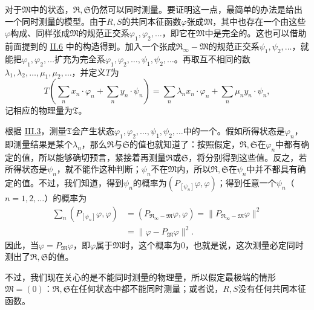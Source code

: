 \documentclass[fontsize=13pt,twoside,openany,headings=normal,parskip=false,bookmarkpackage=false,DIV=calc]{scrbook}
\begin{document}
对于$\mathfrak M$中的状态，$\mathfrak R,\allowbreak \mathfrak S$仍然可以同时测量。要证明这一点，最简单的办法是给出一个同时测量的模型。\hypertarget{origpage-122}{}\label{origpage-122}由于$R,\allowbreak S$的共同本征函数$\varphi$张成$\mathfrak M$，其中也存在一个由这些$\varphi$构成、同样张成$\mathfrak M$的规范正交系$\varphi_1,\allowbreak \varphi_2,\allowbreak \ldots$，即它在$\mathfrak M$中是完全的。这也可以借助前面提到的 \hyperref[sec:II.6]{II.6} 中的构造得到。加入一个张成$\mathfrak R_\infty-\mathfrak M$的规范正交系$\psi_1,\allowbreak \psi_2,\allowbreak \ldots$，就能把$\varphi_1,\allowbreak \varphi_2,\allowbreak \ldots$扩充为完全系$\varphi_1,\allowbreak \varphi_2,\allowbreak \ldots,\allowbreak \psi_1,\allowbreak \psi_2,\allowbreak \ldots$。再取互不相同的数$\lambda_1,\allowbreak \lambda_2,\allowbreak \ldots,\allowbreak \mu_1,\allowbreak \mu_2,\allowbreak \ldots$，并定义$T$为
\[
T\left(\sum_nx_n\cdot\varphi_n+\sum_ny_n\cdot\psi_n\right)
=\sum_n\lambda_nx_n\cdot\varphi_n+\sum_n\mu_ny_n\cdot\psi_n,
\]
记相应的物理量为$\mathfrak T$。

根据 \hyperref[sec:III.3]{III.3}，测量$\mathfrak T$会产生状态$\varphi_1,\allowbreak \varphi_2,\allowbreak \ldots,\allowbreak \psi_1,\allowbreak \psi_2,\allowbreak \ldots$中的一个。假如所得状态是$\varphi_n$，即测量结果是某个$\lambda_n$，那么$\mathfrak R$与$\mathfrak S$的值也就知道了：按照假定，$\mathfrak R,\allowbreak \mathfrak S$在$\varphi_n$中都有确定的值，所以能够确切预言，紧接着再测量$\mathfrak R$或$\mathfrak S$，将分别得到这些值。反之，若所得状态是$\psi_n$，就不能作这种判断；$\psi_n$不在$\mathfrak M$内，所以$\mathfrak R,\allowbreak \mathfrak S$在$\psi_n$中并不都具有确定的值。不过，我们知道，得到$\psi_n$的概率为$(P_{[\psi_n]}\varphi,\allowbreak \varphi)$；得到任意一个$\psi_n$（$n=1,\allowbreak 2,\allowbreak \ldots$）的概率为
\begin{align*}
\sum_n(P_{[\psi_n]}\varphi,\varphi)
&=(P_{\mathfrak R_\infty-\mathfrak M}\varphi,\varphi)
=\|P_{\mathfrak R_\infty-\mathfrak M}\varphi\|^2\\
&=\|\varphi-P_{\mathfrak M}\varphi\|^2.
\end{align*}
因此，当$\varphi=P_{\mathfrak M}\varphi$，即$\varphi$属于$\mathfrak M$时，这个概率为$0$，也就是说，这次测量必定同时测出了$\mathfrak R,\allowbreak \mathfrak S$的值。

不过，我们现在关心的是不能同时测量的物理量，所以假定最极端的情形$\mathfrak M=(0)$：$\mathfrak R,\allowbreak \mathfrak S$在任何状态中都不能同时测量；或者说，$R,\allowbreak S$没有任何共同本征函数。
\end{document}
